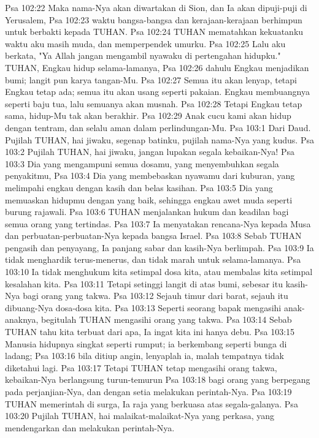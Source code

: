 Psa 102:22  Maka nama-Nya akan diwartakan di Sion, dan Ia akan dipuji-puji di Yerusalem,
Psa 102:23  waktu bangsa-bangsa dan kerajaan-kerajaan berhimpun untuk berbakti kepada TUHAN.
Psa 102:24  TUHAN mematahkan kekuatanku waktu aku masih muda, dan memperpendek umurku.
Psa 102:25  Lalu aku berkata, "Ya Allah jangan mengambil nyawaku di pertengahan hidupku." TUHAN, Engkau hidup selama-lamanya,
Psa 102:26  dahulu Engkau menjadikan bumi; langit pun karya tangan-Mu.
Psa 102:27  Semua itu akan lenyap, tetapi Engkau tetap ada; semua itu akan usang seperti pakaian. Engkau membuangnya seperti baju tua, lalu semuanya akan musnah.
Psa 102:28  Tetapi Engkau tetap sama, hidup-Mu tak akan berakhir.
Psa 102:29  Anak cucu kami akan hidup dengan tentram, dan selalu aman dalam perlindungan-Mu.
Psa 103:1  Dari Daud. Pujilah TUHAN, hai jiwaku, segenap batinku, pujilah nama-Nya yang kudus.
Psa 103:2  Pujilah TUHAN, hai jiwaku, jangan lupakan segala kebaikan-Nya!
Psa 103:3  Dia yang mengampuni semua dosamu, yang menyembuhkan segala penyakitmu,
Psa 103:4  Dia yang membebaskan nyawamu dari kuburan, yang melimpahi engkau dengan kasih dan belas kasihan.
Psa 103:5  Dia yang memuaskan hidupmu dengan yang baik, sehingga engkau awet muda seperti burung rajawali.
Psa 103:6  TUHAN menjalankan hukum dan keadilan bagi semua orang yang tertindas.
Psa 103:7  Ia menyatakan rencana-Nya kepada Musa dan perbuatan-perbuatan-Nya kepada bangsa Israel.
Psa 103:8  Sebab TUHAN pengasih dan penyayang, Ia panjang sabar dan kasih-Nya berlimpah.
Psa 103:9  Ia tidak menghardik terus-menerus, dan tidak marah untuk selama-lamanya.
Psa 103:10  Ia tidak menghukum kita setimpal dosa kita, atau membalas kita setimpal kesalahan kita.
Psa 103:11  Tetapi setinggi langit di atas bumi, sebesar itu kasih-Nya bagi orang yang takwa.
Psa 103:12  Sejauh timur dari barat, sejauh itu dibuang-Nya dosa-dosa kita.
Psa 103:13  Seperti seorang bapak mengasihi anak-anaknya, begitulah TUHAN mengasihi orang yang takwa.
Psa 103:14  Sebab TUHAN tahu kita terbuat dari apa, Ia ingat kita ini hanya debu.
Psa 103:15  Manusia hidupnya singkat seperti rumput; ia berkembang seperti bunga di ladang;
Psa 103:16  bila ditiup angin, lenyaplah ia, malah tempatnya tidak diketahui lagi.
Psa 103:17  Tetapi TUHAN tetap mengasihi orang takwa, kebaikan-Nya berlangsung turun-temurun
Psa 103:18  bagi orang yang berpegang pada perjanjian-Nya, dan dengan setia melakukan perintah-Nya.
Psa 103:19  TUHAN memerintah di surga, Ia raja yang berkuasa atas segala-galanya.
Psa 103:20  Pujilah TUHAN, hai malaikat-malaikat-Nya yang perkasa, yang mendengarkan dan melakukan perintah-Nya.
